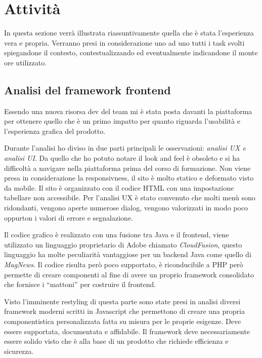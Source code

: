 \documentclass[a4paper]{article}
\begin{document}
\section{Attività}
\par In questa sezione verrà illustrata riassuntivamente quella che è stata l'esperienza vera e propria.
Verranno presi in considerazione uno ad uno tutti i task svolti spiegandone il contesto, contestualizzando
ed eventualmente indicandone il monte ore utilizzato.
\subsection{Analisi del framework frontend}
\par Essendo una nuova risorsa dev del team mi è stata posta davanti la piattaforma per
ottenere quello che è un primo impatto per quanto riguarda l'usabilità e l'esperienza
grafica del prodotto.
\par Durante l'analisi ho diviso in due parti principali le osservazioni: \emph{analisi UX e analisi UI}.
Da quello che ho potuto notare il look and feel è obsoleto e si ha difficoltà a navigare 
nella piattaforma prima del corso di formazione. Non viene presa in considerazione la responsivness,
il sito è molto statico e deformato visto da mobile. Il sito è organizzato con il codice
HTML con una impostazione tabellare non accessibile. Per l'analisi UX è stato convenuto 
che molti menù sono ridondanti, vengono aperte numerose dialog, vengono valorizzati in 
modo poco oppurton i valori di errore e segnalazione.
\par Il codice grafico è realizzato con una fusione tra Java e il frontend, viene utilizzato
un linguaggio proprietario di Adobe chiamato \emph{CloudFusion}, questo linguaggio ha
molte peculiarità vantaggiose per un backend Java come quello di \emph{MagNews}.
Il codice risulta però poco supportato, è riconducibile a PHP però permette di creare
componenti al fine di avere un proprio framework consolidato che fornisce i ``mattoni''
per costruire il frontend.
\par Visto l'imminente restyling di questa parte sono state presi in analisi diversi
framework moderni scritti in Javascript che permettono di creare una propria componentistica
personalizzata fatta su misura per le proprie esigenze. Deve essere supportata, 
documentata e affidabile. Il framework deve necessariamente essere solido visto che 
è alla base di un prodotto che richiede efficienza e sicurezza. \\
\end{document}
